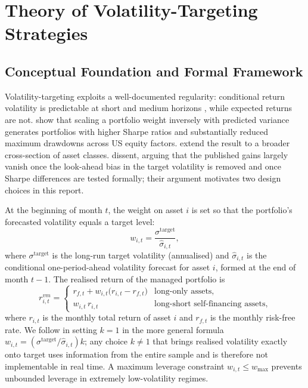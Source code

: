 \documentclass[12pt, a4paper]{article}
\newcommand{\stgt}{\sigma^{\mathrm{target}}}
\newcommand{\shat}{\hat{\sigma}}
\begin{document}
\section{Theory of Volatility-Targeting Strategies}

\subsection{Conceptual Foundation and Formal Framework}

Volatility-targeting exploits a well-documented regularity: conditional return volatility
is predictable at short and medium horizons \citep{andersen2003}, while expected returns
are not. \citet{moreira2017} show that scaling a portfolio weight inversely with predicted
variance generates portfolios with higher Sharpe ratios and substantially reduced maximum
drawdowns across US equity factors. \citet{harvey2018} extend the result to a broader
cross-section of asset classes. \citet{liu2019} dissent, arguing that the published gains
largely vanish once the look-ahead bias in the target volatility is removed and once Sharpe
differences are tested formally; their argument motivates two design choices in this report.

At the beginning of month $t$, the weight on asset $i$ is set so that the portfolio's
forecasted volatility equals a target level:
\begin{equation}
w_{i,t} = \frac{\stgt}{\shat_{i,t}},
\label{eq:weight}
\end{equation}
where $\stgt$ is the long-run target volatility (annualised) and $\shat_{i,t}$ is the
conditional one-period-ahead volatility forecast for asset $i$, formed at the end of
month $t-1$. The realised return of the managed portfolio is
\begin{equation}
r^{vm}_{i,t} =
\begin{cases}
r_{f,t} + w_{i,t}\bigl(r_{i,t} - r_{f,t}\bigr) & \text{long-only assets,}\\
w_{i,t}\,r_{i,t} & \text{long-short self-financing assets,}
\end{cases}
\end{equation}
where $r_{i,t}$ is the monthly total return of asset $i$ and $r_{f,t}$ is the monthly
risk-free rate. We follow \citet{bongaerts2020} in setting $k=1$ in the more general
formula $w_{i,t}=(\stgt/\shat_{i,t})k$; any choice $k\neq 1$ that brings realised volatility
exactly onto target uses information from the entire sample and is therefore not
implementable in real time. A maximum leverage constraint $w_{i,t}\le w_{\max}$ prevents
unbounded leverage in extremely low-volatility regimes.
\end{document}
